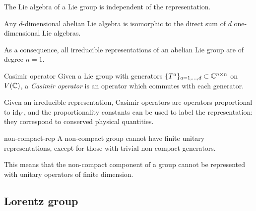 \begin{proposition}{}{}
  The Lie algebra of a Lie group is independent of the representation.
\end{proposition}

\begin{proposition}{}{}
  Any $ d $-dimensional abelian Lie algebra is isomorphic to the direct sum of $ d $ one-dimensional Lie algebras.
\end{proposition}

As a consequence, all irreducible representations of an abelian Lie group are of degree $ n = 1 $.

\begin{definition}{Casimir operator}{}
  Given a Lie group with generators $ \{T^a\}_{a = 1, \dots, d} \subset \mathbb{C}^{n \times n} $ on $ V(\mathbb{C}) $, a \textit{Casimir operator} is an operator which commutes with each generator.
\end{definition}

Given an irreducible representation, Casimir operators are operators proportional to $ \operatorname{id}_V $, and the proportionality constants can be used to label the representation: they correspond to conserved physical quantities.

\begin{proposition}{}{non-compact-rep}
  A non-compact group cannot have finite unitary representations, except for those with trivial non-compact generators.
\end{proposition}

This means that the non-compact component of a group cannot be represented with unitary operators of finite dimension.

\subsection{Lorentz group}

